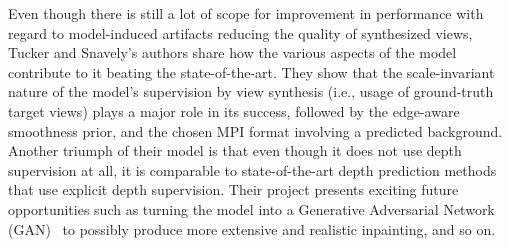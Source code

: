 Even though there is still a lot of scope for improvement in performance with regard to model-induced artifacts reducing the quality of synthesized views, Tucker and Snavely's authors share how the various aspects of the model contribute to it beating the state-of-the-art. They show that the scale-invariant nature of the model's supervision by view synthesis (i.e., usage of ground-truth target views) plays a major role in its success, followed by the edge-aware smoothness prior, and the chosen MPI format involving a predicted background. Another triumph of their model is that even though it does not use depth supervision at all, it is comparable to state-of-the-art depth prediction methods that use explicit depth supervision. Their project presents exciting future opportunities such as turning the model into a Generative Adversarial Network (GAN)~\cite{goodfellow_generative_2014} to possibly produce more extensive and realistic inpainting, and so on.